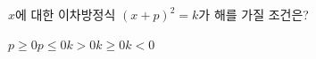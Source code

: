 $x$에 대한 이차방정식 $(x+p)^2=k$가 해를 가질 조건은?
\begin{choices32}{$p\ge 0$}{$p\le 0$}{$k>0$}{$k\ge 0$}{$k<0$}\end{choices32}
